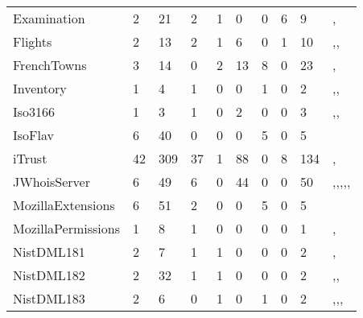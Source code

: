 \begin{table*}[t]
\begin{tabular}{llllllllll}
Examination & 2 & 21      &       2      &    1         &    0      &      0  &   6    & 9 & \cite{kapfhammer2013search},\cite{mcminn2015effectiveness}   \\
Flights   &   2 & 13      &      2       &     1        &    6      &    0    &    1   & 10 &  \cite{kapfhammer2013search},\cite{wright2014impact},\cite{mcminn2015effectiveness}  \\
FrenchTowns  & 3 & 14     &      0       &     2        &    13     &   8     &   0    & 23 & \cite{kapfhammer2013search},\cite{mcminn2015effectiveness}   \\
Inventory    & 1 &  4     &    1         &   0          &        0  &    1    &  0     & 2 &  \cite{mcminn2016virtual},\cite{kapfhammer2013search},\cite{mcminn2015effectiveness}\\
Iso3166      & 1 &  3     &      1       &    0         &    2      &    0    &  0     & 3 &  \cite{mcminn2016virtual},\cite{kapfhammer2013search},\cite{mcminn2015effectiveness}\\
IsoFlav & 6 & 40          &        0     &      0       &   0       &    5    &   0    & 5 & \cite{wright2014impact} \\
iTrust & 42 & 309         &       37     &       1      &    88     &    0    &   8    & 134 & \cite{mcminn2015effectiveness},\cite{kinneer2015automatically}  \\
JWhoisServer & 6 & 49     &      6       &    0         &  44       &    0    &    0   & 50 &  \cite{mcminn2016virtual},\cite{kapfhammer2013search},\cite{wright2013efficient},\cite{wright2014impact},\cite{mcminn2015effectiveness},\cite{kinneer2015automatically}\\
MozillaExtensions & 6 & 51 &     2       &        0     &   0       &    5    &   0    & 5  & \cite{mcminn2015effectiveness} \\
MozillaPermissions& 1 & 8 &     1        &   0          &     0     &    0    &     0  & 1  &  \cite{mcminn2016virtual},\cite{mcminn2015effectiveness}\\
NistDML181 & 2 & 7        &     1        &      1       &    0      &    0    &   0    & 2 & \cite{kapfhammer2013search},\cite{mcminn2015effectiveness}  \\
NistDML182 & 2 & 32       &     1        &      1       &    0      &    0    &   0    & 2 & \cite{kapfhammer2013search},\cite{wright2013efficient},\cite{mcminn2015effectiveness}  \\
NistDML183 & 2 &   6      &     0        &      1       &    0      &    1    &   0    & 2 & \cite{kapfhammer2013search},\cite{wright2013efficient},\cite{wright2014impact},\cite{mcminn2015effectiveness}  \\

\end{tabular}
\end{table*}
